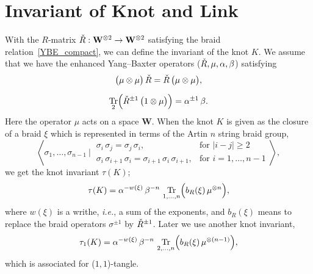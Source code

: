 \documentclass[12pt]{article}
\numberwithin{equation}{section}
\DeclareMathOperator{\Tr}{Tr}
\begin{document}
\section{Invariant of Knot and Link}
\label{sec:invariant}

With the ${R}$-matrix
$\Check{R}: \mathbf{W}^{\otimes 2} \to \mathbf{W}^{\otimes 2}$
satisfying the braid
relation~\eqref{YBE_compact},
we can define the invariant of  the  knot $K$.
We assume that we
have the  enhanced Yang--Baxter operators
($\Check{R}, \mu , \alpha, \beta$)
satisfying~\cite{Turae88}
\begin{subequations}
  \label{other_enhanced}
  \begin{gather}
    \bigl( \mu \otimes \mu \bigr) \, \Check{R}
    =
    \Check{R} \, \bigl( \mu \otimes \mu \bigr) ,
    \\[2mm]
    \Tr_2 \Bigl(
    \Check{R}^{\pm 1} \, 
    \bigl( 1 \otimes \mu \bigr)
    \Bigr)
    =
    \alpha^{\pm 1} \, \beta  .
  \end{gather}
\end{subequations}
Here the operator $\mu$ acts on a space $\mathbf{W}$.
When the knot $K$ is given as the closure of
a braid $\xi$ which is represented  in terms of
the Artin $n$ string braid group,
\begin{equation}
  \left\langle
    \sigma_1, \dots, \sigma_{n-1}
    \ \Big| \
    \begin{array}{ll}
      \sigma_i \, \sigma_j = \sigma_j \, \sigma_i,
      &
      \text{for $|i-j| \geq 2$}
      \\[2mm]
      \sigma_i \, \sigma_{i+1} \, \sigma_i
      =
      \sigma_{i+1} \, \sigma_i \, \sigma_{i+1} ,
      &
      \text{for $i=1,\dots,n-1$}
    \end{array}
  \right\rangle ,
\end{equation}
we get the knot invariant $\tau(K)$;
\begin{equation}
  \tau(K)
  =
  \alpha^{- w(\xi)} \, \beta^{-n} \,
  \Tr_{1,\dots, n}
  \Bigl(
  b_R(\xi) \, \mu^{\otimes n}
  \Bigr)  ,
\end{equation}
where $w(\xi)$ is a writhe, \emph{i.e.},  a sum of the exponents, and
$b_R(\xi)$ means   to replace the braid operators $\sigma^{\pm 1}$
by $\Check{R}^{\pm 1}$.
Later we   use another knot  invariant,
\begin{equation}
  \label{tau_1_invariant}
  \tau_1(K)
  =
  \alpha^{- w(\xi)} \,
  \beta^{-n} \,
  \Tr_{2,\dots,n}
  \Bigl(
  b_R(\xi) \, \mu^{\otimes (n-1)}
  \Bigr) ,
\end{equation}
which is associated for ($1,1$)-tangle.
\end{document}
